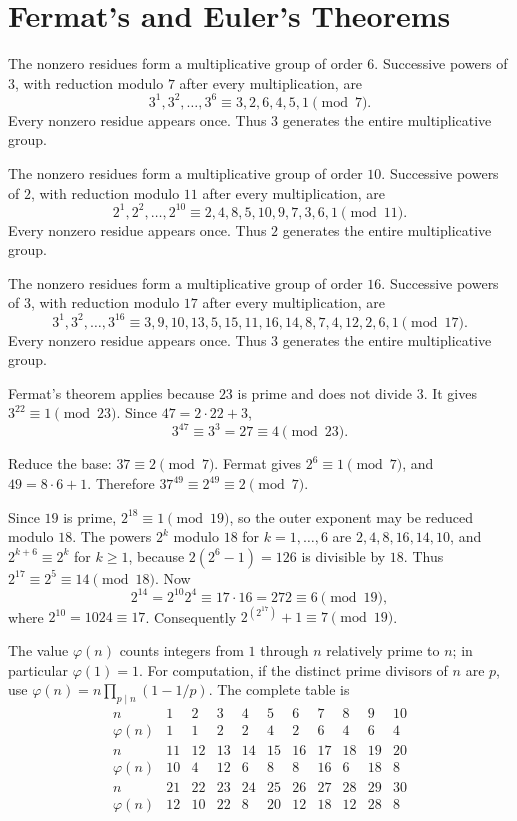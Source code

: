 \section{Fermat's and Euler's Theorems}

The nonzero residues form a multiplicative group of order $6$. Successive powers of $3$, with reduction modulo $7$ after every multiplication, are
\[3^1,3^2,\ldots,3^{6}\equiv 3,2,6,4,5,1\pmod{7}.
\]
Every nonzero residue appears once. Thus $\boxed{3}$ generates the entire multiplicative group.

The nonzero residues form a multiplicative group of order $10$. Successive powers of $2$, with reduction modulo $11$ after every multiplication, are
\[2^1,2^2,\ldots,2^{10}\equiv 2,4,8,5,10,9,7,3,6,1\pmod{11}.
\]
Every nonzero residue appears once. Thus $\boxed{2}$ generates the entire multiplicative group.

The nonzero residues form a multiplicative group of order $16$. Successive powers of $3$, with reduction modulo $17$ after every multiplication, are
\[3^1,3^2,\ldots,3^{16}\equiv 3,9,10,13,5,15,11,16,14,8,7,4,12,2,6,1\pmod{17}.
\]
Every nonzero residue appears once. Thus $\boxed{3}$ generates the entire multiplicative group.

Fermat's theorem applies because $23$ is prime and does not divide $3$. It gives $3^{22}\equiv1\pmod {23}$. Since $47=2\cdot22+3$,
\[3^{47}\equiv3^3=27\equiv\boxed4\pmod {23}.
\]

Reduce the base: $37\equiv2\pmod7$. Fermat gives $2^6\equiv1\pmod7$, and $49=8\cdot6+1$. Therefore $37^{49}\equiv2^{49}\equiv\boxed2\pmod7$.

Since $19$ is prime, $2^{18}\equiv1\pmod {19}$, so the outer exponent may be reduced modulo $18$. The powers $2^k$ modulo $18$ for $k=1,\ldots,6$ are $2,4,8,16,14,10$, and $2^{k+6}\equiv2^k$ for $k\ge1$, because $2(2^6-1)=126$ is divisible by $18$. Thus $2^{17}\equiv2^5\equiv14\pmod {18}$. Now
\[2^{14}=2^{10}2^4\equiv17\cdot16=272\equiv6\pmod {19},
\]
where $2^{10}=1024\equiv17$. Consequently $2^{(2^{17})}+1\equiv\boxed7\pmod {19}$.

The value $\varphi(n)$ counts integers from $1$ through $n$ relatively prime to $n$; in particular $\varphi(1)=1$. For computation, if the distinct prime divisors of $n$ are $p$, use $\varphi(n)=n\prod_{p\mid n}(1-1/p)$. The complete table is
\[
\begin{array}{c|rrrrrrrrrr}
n&1&2&3&4&5&6&7&8&9&10\\\hline
\varphi(n)&1&1&2&2&4&2&6&4&6&4\\[0.4em]
n&11&12&13&14&15&16&17&18&19&20\\\hline
\varphi(n)&10&4&12&6&8&8&16&6&18&8\\[0.4em]
n&21&22&23&24&25&26&27&28&29&30\\\hline
\varphi(n)&12&10&22&8&20&12&18&12&28&8\\[0.4em]
\end{array}\]

